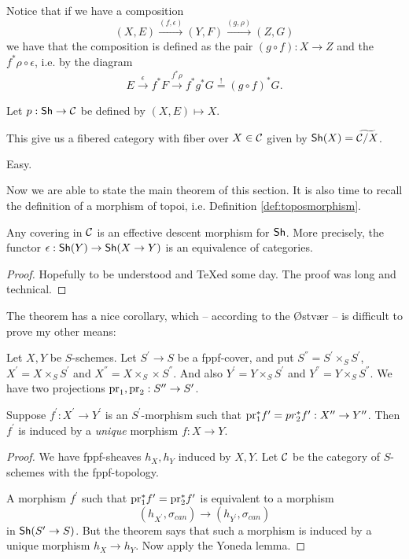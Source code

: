 \documentclass[11pt, english]{article}
\begin{document}
Notice that if we have a composition
\[
(X,E) \xrightarrow{(f,\epsilon)} (Y,F) \xrightarrow{(g,\rho)} (Z,G)
\]
we have that the composition is defined as the pair $(g \circ f):X \to Z$ and the $f^\ast \rho \circ \epsilon$, i.e. by the diagram
\[
E \xrightarrow{\epsilon} f^\ast F \xrightarrow{f^\ast \rho} f^\ast g^\ast G \overset{!}{=} (g \circ f)^\ast G.
\]

Let $p:\mathsf{Sh} \to \mathcal{C}$ be defined by $(X,E) \mapsto X$.
\begin{exc}
This give us a fibered category with fiber over $X \in \mathcal{C}$ given by  $\mathsf{Sh}(X)=\widetilde{\mathcal{C}/X}$.
\end{exc}
\begin{sol}
Easy. 
\end{sol}

Now we are able to state the main theorem of this section. It is also time to recall the definition of a morphism of topoi, i.e. Definition \ref{def:toposmorphism}.

\begin{thm}
\label{thm:desc}
Any covering in $\mathcal{C}$ is an effective descent morphism for $\mathsf{Sh}$. More precisely, the functor $\epsilon:\mathsf{Sh}(Y) \to \mathsf{Sh}(X \to Y)$ is an equivalence of categories.
\end{thm} 

\begin{proof}
Hopefully to be understood and TeXed some day. The proof was long and technical.
\end{proof}

The theorem has a nice corollary, which -- according to the Østvær -- is difficult to prove my other means:

\begin{corr}
Let $X,Y$ be $S$-schemes. Let $S^\prime \to S$ be a fppf-cover, and put $S^\dprime = S^\prime \times_S S^\prime$, $X^\prime = X \times_S S^\prime$ and $X^\dprime = X \times_S \times S^{\dprime}$. And also $Y^\prime = Y \times_S S^\prime$ and $Y^\dprime = Y \times_S S^\dprime$. We have two projections $\mathrm{pr}_1, \mathrm{pr}_2 : S^{\prime\prime} \to S^\prime$.

Suppose $f^\prime : X^\prime \to Y^\prime$ is an $S^\prime$-morphism such that $\mathrm{pr}_1^\ast f^\prime = pr_2^\ast f^\prime : X^{\prime\prime} \to Y^{\prime\prime}$. Then $f^\prime$ is induced by a \emph{unique} morphism $f:X \to Y$.
\end{corr}
\begin{proof}
We have fppf-sheaves $h_X, h_Y$ induced by $X,Y$. Let $\mathcal{C}$ be the category of $S$-schemes with the fppf-topology. 

A morphism $f^\prime$ such that $\mathrm{pr}_1^\ast f^\prime = \mathrm{pr}_2^\ast f^\prime$ is equivalent to a morphism 
\[
(h_{X^\prime}, \sigma_{can}) \to (h_{Y^\prime}, \sigma_{can})
\]
in $\mathsf{Sh}(S^\prime \to S)$. But the theorem says that such a morphism is induced by a unique morphism $h_X \to h_Y$. Now apply the Yoneda lemma.
\end{proof} 
\end{document}
